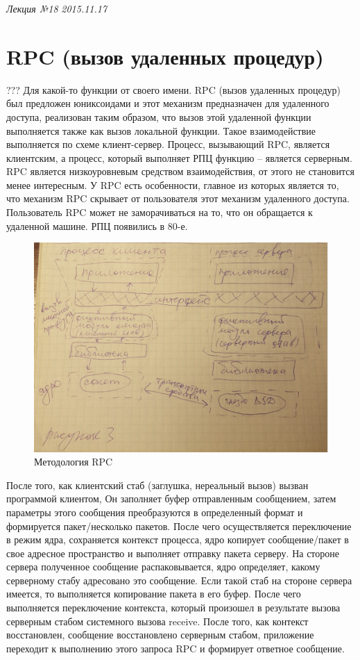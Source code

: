 \clearpage
\begin{flushright}
    \textit{Лекция №18}
    \textit{2015.11.17}
\end{flushright}

\section{RPC (вызов удаленных процедур)}

???
Для какой-то функции от своего имени. RPC (вызов удаленных процедур) был предложен юниксоидами и этот механизм предназначен для удаленного доступа, реализован таким образом, что вызов этой удаленной функции выполняется также как вызов локальной функции. Такое взаимодействие выполняется по схеме клиент-сервер. Процесс, вызывающий RPC, является клиентским, а процесс, который выполняет РПЦ функцию – является серверным. RPC является низкоуровневым средством взаимодействия, от этого не становится менее интересным. У RPC есть особенности, главное из которых является то, что механизм RPC скрывает от пользователя этот механизм удаленного доступа. Пользователь RPC может не заморачиваться на то, что он обращается к удаленной машине.  
РПЦ появились в 80-е. 

\begin{figure}[H]
    \centering
    \includegraphics[width=\textwidth]{pic/3.png}
    \caption{Методология RPC}
\end{figure}

После того, как клиентский стаб (заглушка, нереальный вызов) вызван программой клиентом, Он заполняет буфер отправленным сообщением, затем параметры этого сообщения преобразуются в определенный формат и формируется пакет/несколько пакетов. После чего осуществляется переключение в режим ядра, сохраняется контекст процесса, ядро копирует сообщение/пакет в свое адресное пространство и выполняет отправку пакета серверу. На стороне сервера полученное сообщение распаковывается, ядро определяет, какому серверному стабу адресовано это сообщение. Если такой стаб на стороне сервера имеется, то выполняется копирование пакета в его буфер. После чего выполняется переключение контекста, который произошел в результате вызова серверным стабом системного вызова receive. После того, как контекст восстановлен, сообщение восстановлено серверным стабом, приложение переходит к выполнению этого запроса RPC и формирует ответное сообщение.


